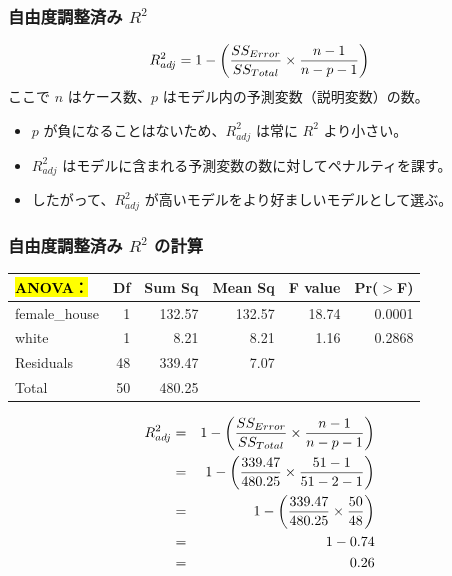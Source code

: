 
\begin{frame}
\frametitle{自由度調整済み $R^2$}

{\[ R^2_{adj} = 1 - \left(  \frac{ SS_{Error} }{ SS_{Total} } \times \frac{n - 1}{n - p - 1}  \right) \]
ここで $n$ はケース数、$p$ はモデル内の予測変数（説明変数）の数。
}

\begin{itemize}

\item $p$ が負になることはないため、$R^2_{adj}$ は常に $R^2$ より小さい。

\item $R^2_{adj}$ はモデルに含まれる予測変数の数に対してペナルティを課す。

\item したがって、$R^2_{adj}$ が高いモデルをより好ましいモデルとして選ぶ。

\end{itemize}

\end{frame}


\begin{frame}
\frametitle{自由度調整済み $R^2$ の計算}

\begin{center}
\begin{tabular}{lrrrrr}
  \hline
\hl{ANOVA：} & Df & Sum Sq & Mean Sq & F value & Pr($>$F) \\
  \hline
female\_house & 1 & 132.57 & 132.57 & 18.74 & 0.0001 \\
  white & 1 & 8.21 & 8.21 & 1.16 & 0.2868 \\
  Residuals & 48 & 339.47 & 7.07 &  &  \\
   \hline
Total & 50 &    480.25\\
   \hline
\end{tabular}
\end{center}

\begin{eqnarray*}
R^2_{adj} &=& 1 - \left(  \frac{ SS_{Error} }{ SS_{Total} } \times \frac{n - 1}{n - p - 1}  \right) \\
&=& 1 - \left(  \frac{ 339.47 }{ 480.25 } \times \frac{51 - 1}{51 - 2 - 1}  \right)   \\
&=& 1- \left(  \frac{ 339.47 }{ 480.25 } \times \frac{50}{48}  \right) \\
&=& 1 -  0.74 \\
&=& 0.26
\end{eqnarray*}

\end{frame}
